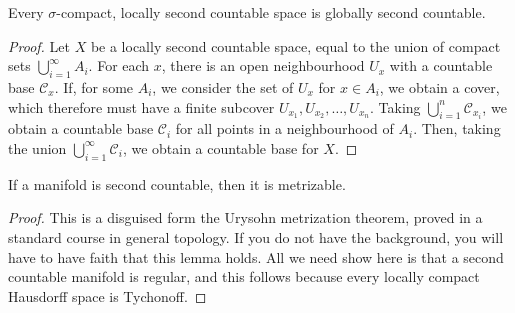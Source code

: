 \begin{lemma}[$1) \to (2$]
    Every $\sigma$-compact, locally second countable space is globally second countable.
\end{lemma}
\begin{proof}
    Let $X$ be a locally second countable space, equal to the union of compact sets $\bigcup_{i = 1}^\infty A_i$. For each $x$, there is an open neighbourhood $U_x$ with a countable base $\mathcal{C}_x$. If, for some $A_i$, we consider the set of $U_x$ for $x \in A_i$, we obtain a cover, which therefore must have a finite subcover $U_{x_1}, U_{x_2}, \dots, U_{x_n}$. Taking $\bigcup_{i = 1}^n \mathcal{C}_{x_i}$, we obtain a countable base $\mathcal{C}_i$ for all points in a neighbourhood of $A_i$. Then, taking the union $\bigcup_{i = 1}^\infty \mathcal{C}_i$, we obtain a countable base for $X$.
\end{proof}

\begin{lemma}[$2) \to (3$]
    If a manifold is second countable, then it is metrizable.
\end{lemma}
\begin{proof}
    This is a disguised form the Urysohn metrization theorem, proved in a standard course in general topology. If you do not have the background, you will have to have faith that this lemma holds. All we need show here is that a second countable manifold is regular, and this follows because every locally compact Hausdorff space is Tychonoff.
\end{proof}

